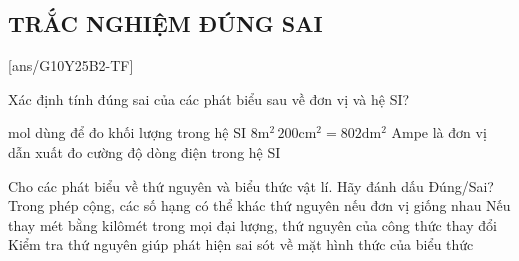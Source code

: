 
\subsection{TRẮC NGHIỆM ĐÚNG SAI}
\setcounter{ex}{0}
[ans/G10Y25B2-TF]
\begin{ex}
	Xác định tính đúng sai của các phát biểu sau về đơn vị và hệ SI?
	
	{$\si{\mole}$ dùng để đo khối lượng trong hệ SI}
	{\True $8\si{\meter^2} \, 200\si{\centi\meter^2} = 802 \si{\deci\meter^2}$}
	{Ampe là đơn vị dẫn xuất đo cường độ dòng điện trong hệ SI}
\end{ex}

\begin{ex}
	Cho các phát biểu về thứ nguyên và biểu thức vật lí. Hãy đánh dấu Đúng/Sai?
	{Trong phép cộng, các số hạng có thể khác thứ nguyên nếu đơn vị giống nhau}
	{Nếu thay mét bằng kilômét trong mọi đại lượng, thứ nguyên của công thức thay đổi}
	{\True Kiểm tra thứ nguyên giúp phát hiện sai sót về mặt hình thức của biểu thức}
\end{ex}

